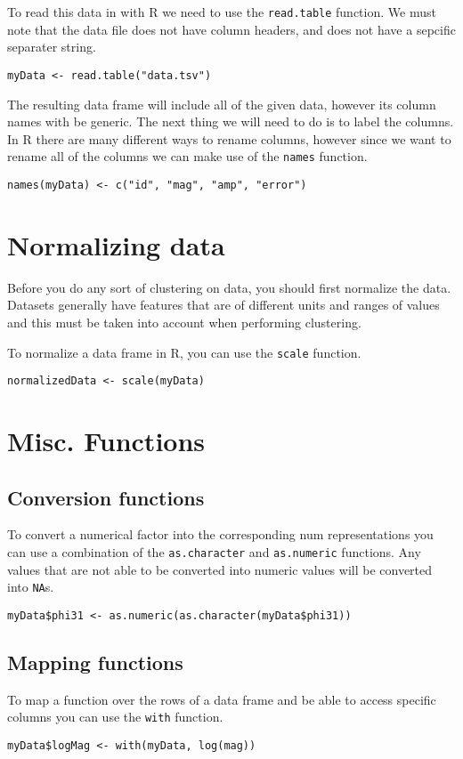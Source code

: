 To read this data in with R we need to use the \verb|read.table| function. We must note that the data file does not have column headers, and does not have a sepcific separater string.

\begin{verbatim}
myData <- read.table("data.tsv")
\end{verbatim}

The resulting data frame will include all of the given data, however its column names with be generic. The next thing we will need to do is to label the columns. In R there are many different ways to rename columns, however since we want to rename all of the columns we can make use of the \verb|names| function.

\begin{verbatim}
names(myData) <- c("id", "mag", "amp", "error")
\end{verbatim}

\section{Normalizing data}
Before you do any sort of clustering on data, you should first normalize the data. Datasets generally have features that are of different units and ranges of values and this must be taken into account when performing clustering.

To normalize a data frame in R, you can use the \verb|scale| function.

\begin{verbatim}
normalizedData <- scale(myData)
\end{verbatim}

\section{Misc. Functions}

\subsection{Conversion functions}
To convert a numerical factor into the corresponding num representations you can use a combination of the \verb|as.character| and \verb|as.numeric| functions. Any values that are not able to be converted into numeric values will be converted into \verb|NA|s.

\begin{verbatim}
myData$phi31 <- as.numeric(as.character(myData$phi31))
\end{verbatim}

\subsection{Mapping functions}
To map a function over the rows of a data frame and be able to access specific columns you can use the \verb|with| function.

\begin{verbatim}
myData$logMag <- with(myData, log(mag))
\end{verbatim}